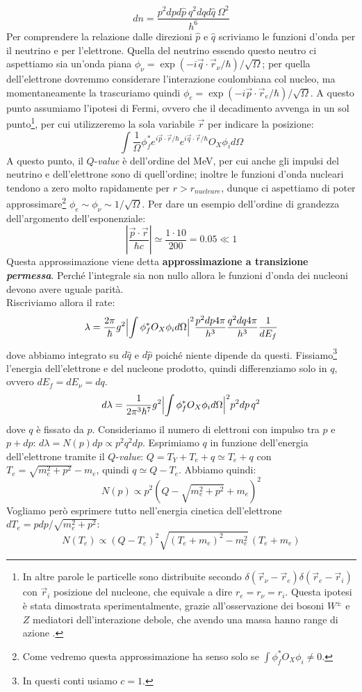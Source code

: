 $$dn = \frac{p^2 dp d\hat{p}\:q^2dqd\hat{q}\:\Omega^2}{h^6}$$
Per comprendere la relazione dalle direzioni $\hat{p}$ e $\hat{q}$ scriviamo le funzioni d'onda per il neutrino e per l'elettrone. Quella del neutrino essendo questo neutro ci aspettiamo sia un'onda piana $\phi_\nu = \exp{(-i\vec{q}\cdot\vec{r}_\nu/\hbar)}/\sqrt{\Omega}$; per quella dell'elettrone dovremmo considerare l'interazione coulombiana col nucleo, ma momentaneamente la trascuriamo quindi $\phi_e = \exp{(-i\vec{p}\cdot\vec{r}_e/\hbar)}/\sqrt{\Omega}$. A questo punto assumiamo l'ipotesi di Fermi, ovvero che il decadimento avvenga in un sol punto\footnote{In altre parole le particelle sono distribuite secondo $\delta(\vec{r}_\nu - \vec{r}_e)\delta(\vec{r}_e-\vec{r}_i)$ con $\vec{r}_i$ posizione del nucleone, che equivale a dire $r_e=r_\nu=r_i$. Questa ipotesi è stata dimostrata sperimentalmente, grazie all'osservazione dei bosoni $W^\pm$ e $Z$ mediatori dell'interazione debole, che avendo una massa  hanno range di azione .}, per cui utilizzeremo la sola variabile $\vec{r}$ per indicare la posizione: 
$$\int \frac{1}{\Omega} \phi^*_f e^{i\vec{p}\cdot\vec{r}/\hbar} e^{i\vec{q}\cdot\vec{r}/\hbar} O_X \phi_i d\Omega$$
A questo punto, il $Q$-\textit{value} è dell'ordine del MeV, per cui anche gli impulsi del neutrino e dell'elettrone sono di quell'ordine; inoltre le funzioni d'onda nucleari tendono a zero molto rapidamente per $r>r_{nucleare}$, dunque ci aspettiamo di poter approssimare\footnote{Come vedremo questa approssimazione ha senso solo se $\int \phi^*_f O_X \phi_i \not = 0$.} $\phi_e\sim\phi_\nu\sim 1/\sqrt{\Omega}$. Per dare un esempio dell'ordine di grandezza dell'argomento dell'esponenziale:
$$|\frac{\vec{p}\cdot\vec{r}}{\hbar c}|\simeq \frac{1\cdot10}{200}=0.05\ll 1$$
Questa approssimazione viene detta \textbf{approssimazione a transizione \textit{permessa}}. Perché l'integrale sia non nullo allora le funzioni d'onda dei nucleoni devono avere uguale parità.\\
Riscriviamo allora il rate:
$$\lambda = \frac{2\pi}{\hbar}g^2 \Bigl |\int \phi_f^* O_X \phi_i d\Omega\Bigr |^2 \frac{p^2 dp 4\pi}{h^3}\frac{q^2dq4\pi}{h^3}\frac{1}{dE_f}$$
dove abbiamo integrato su $d\hat{q}$ e $d\hat{p}$ poiché niente dipende da questi. Fissiamo\footnote{In questi conti usiamo $c=1$.} l'energia dell'elettrone e del nucleone prodotto, quindi differenziamo solo in $q$, ovvero $dE_f = dE_\nu = dq$.
$$d\lambda = \frac{1}{2\pi^3 \hbar^7}g^2 \Bigl |\int \phi_f^* O_X \phi_i d\Omega\Bigr |^2 p^2 dp\, q^2 $$
dove $q$ è fissato da $p$. Consideriamo il numero di elettroni con impulso tra $p$ e $p+dp$: $d\lambda = N(p)dp \propto p^2 q^2 dp$. Esprimiamo $q$ in funzione dell'energia dell'elettrone tramite il $Q$-\textit{value}: $Q = T_Y + T_e + q \simeq T_e + q$ con $T_e = \sqrt{m_e^2 + p^2}-m_e$, quindi $q \simeq Q-T_e$. Abbiamo quindi:
$$N(p) \propto p^2(Q-\sqrt{m_e^2 + p^2}+m_e)^2$$
Vogliamo però esprimere tutto nell'energia cinetica dell'elettrone $dT_e = pdp/\sqrt{m_e^2+p^2}$:
$$N(T_e) \propto (Q-T_e)^2 \sqrt{(T_e+m_e)^2-m_e^2}\,(T_e + m_e) $$

